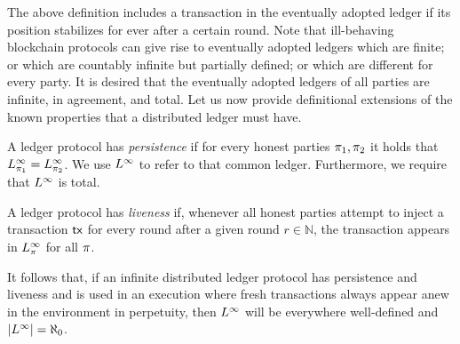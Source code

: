 The above definition includes a transaction in the eventually adopted ledger if
its position stabilizes for ever after a certain round. Note that ill-behaving
blockchain protocols can give rise to eventually adopted ledgers which are
finite; or which are countably infinite but partially defined; or which are
different for every party. It is desired that the eventually adopted ledgers of
all parties are infinite, in agreement, and total. Let us now provide
definitional extensions of the known properties that a distributed ledger must
have.

\begin{definition}[Persistence]
  A ledger protocol has \emph{persistence} if for every honest parties
  $\pi_1, \pi_2$ it holds that
  $L_{\pi_1}^\infty = L_{\pi_2}^\infty$. We use
  $L^\infty$ to refer to that common ledger. Furthermore, we require that
  $L^\infty$ is total.
\end{definition}

\begin{definition}[Liveness]
  A ledger protocol has \emph{liveness} if, whenever all honest parties attempt
  to inject a transaction $\textsf{tx}$ for every round after a given round
  $r \in \mathbb{N}$, the transaction appears in $L_\pi^\infty$ for all
  $\pi$.
\end{definition}

It follows that, if an infinite distributed ledger protocol has persistence and
liveness and is used in an execution where fresh transactions always appear
anew in the environment in perpetuity, then $L^\infty$ will be
everywhere well-defined and $|L^\infty| = \aleph_0$.
